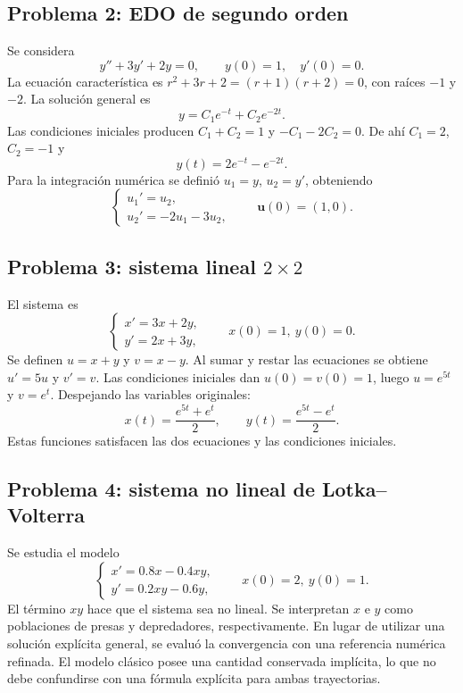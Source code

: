 \documentclass[12pt,letterpaper]{article}
\begin{document}
\subsection{Problema 2: EDO de segundo orden}
Se considera
\begin{equation}y''+3y'+2y=0,\qquad y(0)=1,\quad y'(0)=0.\end{equation}
La ecuación característica es $r^2+3r+2=(r+1)(r+2)=0$, con raíces $-1$ y $-2$. La solución general es
\begin{equation}y=C_1e^{-t}+C_2e^{-2t}.\end{equation}
Las condiciones iniciales producen $C_1+C_2=1$ y $-C_1-2C_2=0$. De ahí $C_1=2$, $C_2=-1$ y
\begin{equation}\boxed{y(t)=2e^{-t}-e^{-2t}.}\end{equation}
Para la integración numérica se definió $u_1=y$, $u_2=y'$, obteniendo
\begin{equation}\begin{cases}u_1'=u_2,\\u_2'=-2u_1-3u_2,\end{cases}\qquad \mathbf{u}(0)=(1,0).\end{equation}
\subsection{Problema 3: sistema lineal $2\times2$}
El sistema es
\begin{equation}\begin{cases}x'=3x+2y,\\y'=2x+3y,\end{cases}\qquad x(0)=1,\ y(0)=0.\end{equation}
Se definen $u=x+y$ y $v=x-y$. Al sumar y restar las ecuaciones se obtiene $u'=5u$ y $v'=v$. Las condiciones iniciales dan $u(0)=v(0)=1$, luego $u=e^{5t}$ y $v=e^t$. Despejando las variables originales:
\begin{equation}\boxed{x(t)=\frac{e^{5t}+e^t}{2},\qquad y(t)=\frac{e^{5t}-e^t}{2}.}\end{equation}
Estas funciones satisfacen las dos ecuaciones y las condiciones iniciales.
\subsection{Problema 4: sistema no lineal de Lotka--Volterra}
Se estudia el modelo
\begin{equation}\begin{cases}x'=0.8x-0.4xy,\\y'=0.2xy-0.6y,\end{cases}\qquad x(0)=2,\ y(0)=1.\end{equation}
El término $xy$ hace que el sistema sea no lineal. Se interpretan $x$ e $y$ como poblaciones de presas y depredadores, respectivamente. En lugar de utilizar una solución explícita general, se evaluó la convergencia con una referencia numérica refinada. El modelo clásico posee una cantidad conservada implícita, lo que no debe confundirse con una fórmula explícita para ambas trayectorias.
\end{document}
